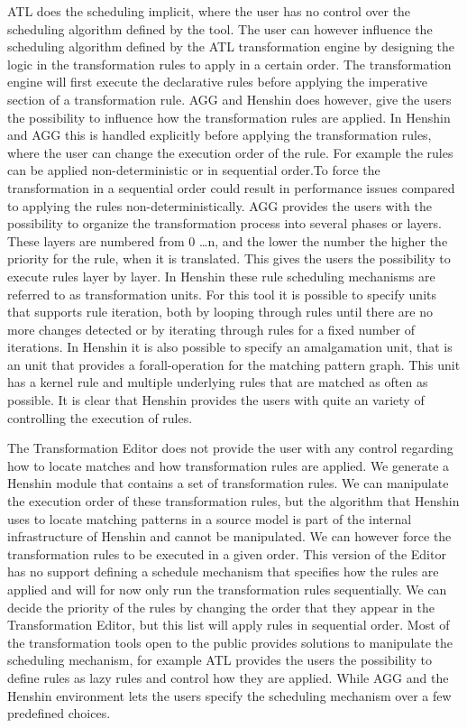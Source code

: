 ATL does the scheduling implicit, where the user has no control over the
scheduling algorithm defined by the tool. The user can however influence the scheduling
algorithm defined by the ATL transformation engine by designing the logic in the
transformation rules to apply in a certain order. The transformation
engine will first execute the declarative rules before applying the imperative
section of a transformation rule. AGG and Henshin does however, give the
users the possibility to influence how the transformation rules are applied. 
In Henshin and AGG this is handled explicitly before applying the transformation
rules, where the user can change the execution order of the rule.
For example the rules can be applied non-deterministic or in sequential order.To
force the transformation in a sequential order could result in performance
issues compared to applying the rules non-deterministically. AGG provides the
users with the possibility to organize the transformation process into several
phases or layers. These layers are numbered from 0 \ldots n, and the lower the
number the higher the priority for the rule, when it is translated. This gives
the users the possibility to execute rules layer by layer. In Henshin these
rule scheduling mechanisms are referred to as transformation units. For this
tool it is possible to specify units that supports rule iteration, both by
looping through rules until there are no more changes detected or by iterating
through rules for a fixed number of iterations. In Henshin it is also possible
to specify an amalgamation unit, that is an unit that provides a
forall-operation for the matching pattern graph. This unit has a kernel rule
and multiple underlying rules that are matched as often as possible. It is
clear that Henshin provides the users with quite an variety of controlling the
execution of rules.

The Transformation Editor does not provide the user with any control regarding
how to locate matches and how transformation rules are applied. We generate a
Henshin module that contains a set of transformation rules. We can manipulate
the execution order of these transformation rules, but the algorithm that
Henshin uses to locate matching patterns in a source model is part of the
internal infrastructure of Henshin and cannot be manipulated. We can however
force the transformation rules to be executed in a given order. This version of
the Editor has no support defining a schedule mechanism that specifies how the
rules are applied and will for now only run the transformation rules
sequentially. We can decide the priority of the rules by changing the order
that they appear in the Transformation Editor, but this list will apply rules in
sequential order. Most of the transformation tools open to the public provides
solutions to manipulate the scheduling mechanism, for example ATL provides the
users the possibility to define rules as lazy rules and control how they are
applied. While AGG and the Henshin environment lets the users specify the
scheduling mechanism over a few predefined choices. 

